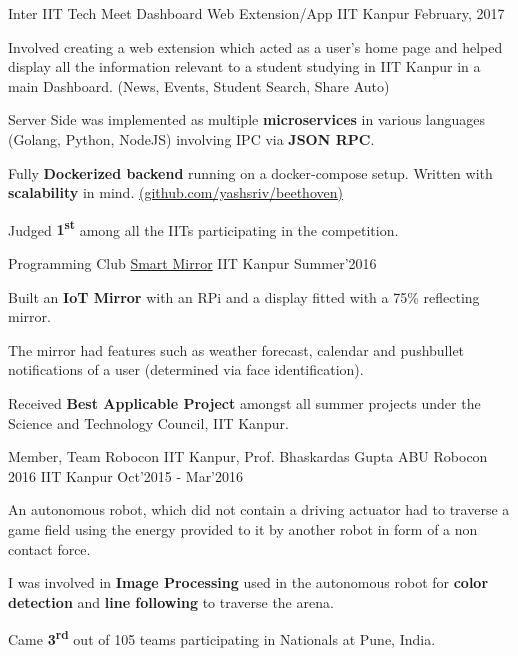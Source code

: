 
\begin{cventries}

  \cventry
  {Inter IIT Tech Meet}
  {Dashboard Web Extension/App}
  {IIT Kanpur}
  {February, 2017}
  {
    \begin{cvitems}
    \item Involved creating a web extension which acted as a user’s home page
      and helped display all the information relevant to a student studying in
      IIT Kanpur in a main Dashboard. (News, Events, Student Search, Share Auto)
    \item Server Side was implemented as multiple \textbf{microservices} in
      various languages (Golang, Python, NodeJS) involving IPC via \textbf{JSON
        RPC}.
    \item Fully \textbf{Dockerized backend} running on a docker-compose setup.
      Written with \textbf{scalability} in mind.
      \href{https://github.com/yashsriv/beethoven}{(github.com/yashsriv/beethoven)}
    \item Judged \textbf{1\textsuperscript{st}} among all the IITs participating
      in the competition.
    \end{cvitems}
  }

  \cventry
  {Programming Club}
  {\href{http://pclub.in/project/2016/07/06/smartmirror.html}{Smart Mirror}}
  {IIT Kanpur}
  {Summer'2016}
  {
    \begin{cvitems}
    \item Built an \textbf{IoT Mirror} with an RPi and a display fitted with a 75\%
      reflecting mirror.
    \item The mirror had features such as weather forecast, calendar
      and pushbullet notifications of a user (determined via face
      identification).
    \item Received \textbf{Best Applicable Project} amongst all summer projects under
      the Science and Technology Council, IIT Kanpur.
    \end{cvitems}
  }

  \cventry
  {Member, Team Robocon IIT Kanpur, Prof. Bhaskardas Gupta}
  {ABU Robocon 2016}
  {IIT Kanpur}
  {Oct'2015 - Mar'2016}
  {
    \begin{cvitems}
      \item An autonomous robot, which did not contain a driving actuator had to
        traverse a game field using the energy provided to it by another robot in
        form of a non contact force.
      \item I was involved in \textbf{Image Processing} used in the autonomous
        robot for \textbf{color detection} and \textbf{line following} to
        traverse the arena.
      \item Came \textbf{3\textsuperscript{rd}} out of 105 teams participating in Nationals at Pune, India.
    \end{cvitems}
  }


\end{cventries}
